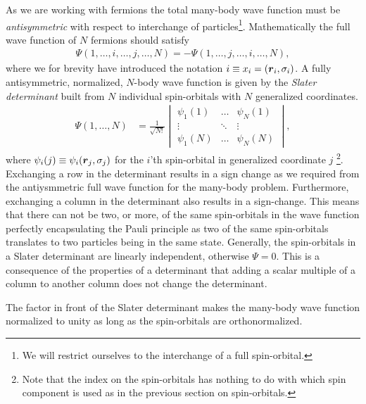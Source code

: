         As we are working with fermions the total many-body wave function must
        be \emph{antisymmetric} with respect to interchange of
        particles\footnote{We will restrict ourselves to the interchange of a
        full spin-orbital.}. Mathematically the full wave function of $N$
        fermions should satisfy
        \begin{align}
            \Psi(1, \dots, i, \dots, j, \dots, N)
            =
            -\Psi(1, \dots, j, \dots, i, \dots, N),
        \end{align}
        where we for brevity have introduced the notation $i \equiv x_i =
        (\boldsymbol{r}_i, \sigma_i)$. A fully antisymmetric, normalized, $N$-body wave
        function is given by the \emph{Slater determinant} built from $N$
        individual spin-orbitals with $N$ generalized coordinates.
        \begin{align}
            \Psi(1, \dots, N)
            &= \frac{1}{\sqrt{N!}}
            \begin{vmatrix}
                \psi_1(1) & \dots & \psi_N(1) \\
                \vdots & \ddots & \vdots \\
                \psi_1(N) & \dots & \psi_N(N)
            \end{vmatrix},
            \label{eq:coord_slater}
        \end{align}
        where $\psi_i(j) \equiv \psi_i(\boldsymbol{r}_j, \sigma_j)$ for the $i$'th
        spin-orbital in generalized coordinate $j$ \footnote{Note that the index
        on the spin-orbitals has nothing to do with which spin component is used
        as in the previous section on spin-orbitals.}. Exchanging a row in the
        determinant results in a sign change as we required from the
        antiysmmetric full wave function for the many-body problem. Furthermore,
        exchanging a column in the determinant also results in a sign-change.
        This means that there can not be two, or more, of the same spin-orbitals
        in the wave function perfectly encapsulating the Pauli principle as two
        of the same spin-orbitals translates to two particles being in the same
        state. Generally, the spin-orbitals in a Slater determinant are linearly
        independent, otherwise $\Psi = 0$. This is a consequence of the
        properties of a determinant that adding a scalar multiple of a column to
        another column does not change the determinant.

        The factor in front of the Slater determinant makes the many-body wave
        function normalized to unity as long as the spin-orbitals are
        orthonormalized.

